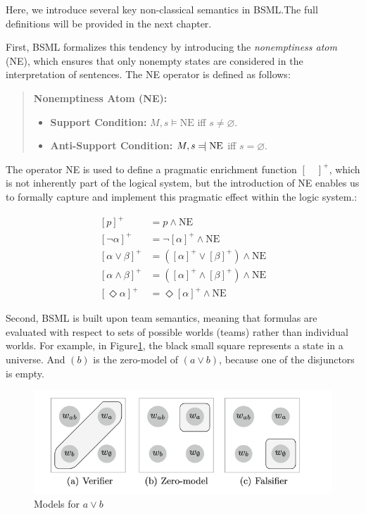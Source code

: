 Here, we introduce several key non-classical semantics in BSML.\@ The full definitions will be provided in the next chapter.\@


First, BSML formalizes this tendency by introducing the \textit{nonemptiness atom} (NE), which ensures that only nonempty states are considered in the interpretation of sentences. 
The NE operator is defined as follows:  

\begin{quote}
    \textbf{Nonemptiness Atom (NE):} 
    \begin{itemize}
        \item \textbf{Support Condition:} $M, s \models \text{NE}$ iff $s \neq \varnothing$.
        \item \textbf{Anti-Support Condition:} $M, s \leftmodels \text{NE}$ iff $s = \varnothing$.
    \end{itemize}
\end{quote}


    The operator NE is used to define a pragmatic enrichment function \({[ \quad]}^+\), which is not inherently part of the logical system, 
    but the introduction of NE enables us to formally capture and implement this pragmatic effect within the logic system.:


\begin{align*}
    {[p]}^+ &= p \land \text{NE} \\
    {[\neg \alpha]}^+ &= \neg {[\alpha]}^+ \land \text{NE} \\
    {[\alpha \lor \beta]}^+ &= ({[\alpha]}^+ \lor {[\beta]}^+) \land \text{NE} \\
    {[\alpha \land \beta]}^+ &= ({[\alpha]}^+ \land {[\beta]}^+) \land \text{NE} \\
    {[\Diamond \alpha]}^+ &= \Diamond {[\alpha]}^+ \land \text{NE}
\end{align*}

Second, BSML is built upon team semantics, meaning that formulas are evaluated with respect to sets of possible worlds (teams) rather than individual worlds. 
For example, in Figure\ref{disjunct}, the black small square represents a state in a universe.
And \( (b) \) is the zero-model of \( ( a \vee b ) \), because one of the disjunctors is empty.

\begin{figure}[h]
    \centering
    \includegraphics[width=\textwidth]{image/disj1.png}
    \caption{Models for \( a \vee b \)}\label{disjunct}
\end{figure}

